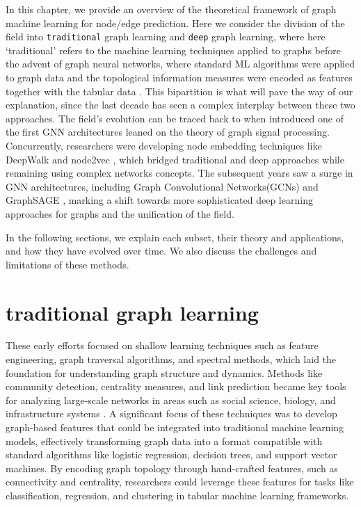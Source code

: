 In this chapter, we provide an overview of the theoretical framework of graph machine learning for node/edge prediction. Here we consider the division of the field into \texttt{traditional} graph learning and \texttt{deep} graph learning, where here `traditional' refers to the machine learning techniques applied to graphs before the advent of graph neural networks, where standard ML algorithms were applied to graph data and the topological information measures were encoded as features together with the tabular data  \cite{costa2007characterization, silva2016machine}. This bipartition is what will pave the way of our explanation, since the last decade has seen a complex interplay between these two approaches. The field's evolution can be traced back to when  introduced one of the first GNN architectures leaned on the theory of graph signal processing. Concurrently, researchers were developing node embedding techniques like DeepWalk \cite{perozzi2014deepwalk} and node2vec \cite{grover2016node2vec}, which bridged traditional and deep approaches while remaining using complex networks concepts. The subsequent years saw a surge in GNN architectures, including Graph Convolutional Networks(GCNs) \cite{kipf2016semi} and GraphSAGE \cite{hamilton2017inductive}, marking a shift towards more sophisticated deep learning approaches for graphs and the unification of the field.  

In the following sections, we explain each subset, their theory and applications, and how they have evolved over time. We also discuss the challenges and limitations of these methods.

\section{traditional graph learning}

These early efforts focused on shallow learning techniques such as feature engineering, graph traversal algorithms, and spectral methods, which laid the foundation for understanding graph structure and dynamics. Methods like community detection, centrality measures, and link prediction \cite{silva2016machine} became key tools for analyzing large-scale networks in areas such as social science, biology, and infrastructure systems \cite{newman2018networks,boccaletti2006complex}. A significant focus of these techniques was to develop graph-based features that could be integrated into traditional machine learning models, effectively transforming graph data into a format compatible with standard algorithms like logistic regression, decision trees, and support vector machines. By encoding graph topology through hand-crafted features, such as connectivity and centrality, researchers could leverage these features for tasks like classification, regression, and clustering in tabular machine learning frameworks.

